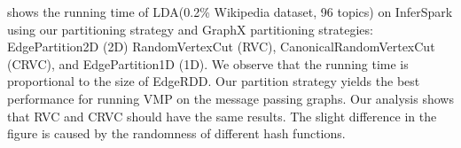  shows the running time of LDA(0.2\% Wikipedia dataset, 96 topics) on InferSpark
using our partitioning strategy  and 
GraphX partitioning strategies: 
EdgePartition2D  (2D)
RandomVertexCut (RVC),
CanonicalRandomVertexCut (CRVC), and
EdgePartition1D (1D).
We observe that the running time is proportional to the size of EdgeRDD.
Our partition strategy yields the best performance for running VMP on the
message passing graphs.  Our analysis shows that RVC and CRVC should have the
same results. The slight difference in the figure is caused by the randomness
of different hash functions.


